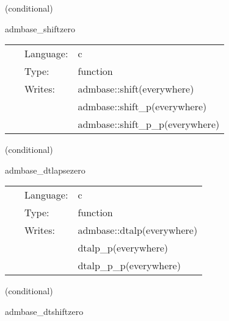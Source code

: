 \documentclass{article}
\begin{document}
\vspace{5mm}

   (conditional) 

\hspace{5mm} admbase\_shiftzero 

\hspace{5mm}{\it set the shift to 0 at all points } 


\hspace{5mm}

 \begin{tabular*}{160mm}{cll} 
~ & Language:  & c \\ 
~ & Type:  & function \\ 
~ & Writes:  & admbase::shift(everywhere) \\ 
~& ~ &admbase::shift\_p(everywhere)\\ 
~& ~ &admbase::shift\_p\_p(everywhere)\\ 
\end{tabular*} 


\vspace{5mm}

   (conditional) 

\hspace{5mm} admbase\_dtlapsezero 

\hspace{5mm}{\it set the dtlapse to 0 at all points } 


\hspace{5mm}

 \begin{tabular*}{160mm}{cll} 
~ & Language:  & c \\ 
~ & Type:  & function \\ 
~ & Writes:  & admbase::dtalp(everywhere) \\ 
~& ~ &dtalp\_p(everywhere)\\ 
~& ~ &dtalp\_p\_p(everywhere)\\ 
\end{tabular*} 


\vspace{5mm}

   (conditional) 

\hspace{5mm} admbase\_dtshiftzero 

\hspace{5mm}{\it set the dtshift to 0 at all points } 


\hspace{5mm}
\end{document}
